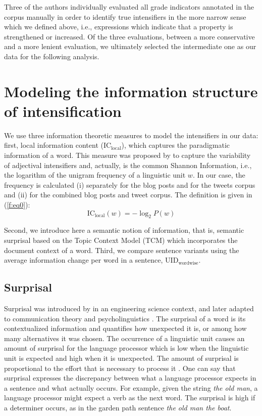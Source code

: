 \documentclass[output=paper,colorlinks,citecolor=brown]{langscibook}
\begin{document}
Three of the authors individually evaluated all  grade indicators annotated in the corpus manually in order to identify true intensifiers in the more narrow sense which we defined above, i.e., expressions which indicate that a property is strengthened or increased. Of the three evaluations, between a more conservative and a more lenient evaluation,  we ultimately selected the intermediate one as our data for the following analysis. 

\section{Modeling the information structure of intensification}\label{sec:information}

We use three information theoretic measures to model the intensifiers in our data: first, local information content ($\mathrm{IC_{local}}$), which captures the paradigmatic information of a word. This measure was proposed by \citet{scherihou2022} to capture the variability of adjectival intensifiers and, actually, is the common Shannon Information, i.e., the logarithm of the unigram frequency of a linguistic unit $w$. In our case, the frequency is calculated (i) separately for the blog posts and for the tweets corpus and (ii) for the combined blog posts and tweet corpus. The definition is given in (\ref{f:eq0}):
\begin{equation}\label{f:eq0}
\text{IC}_{\text{local}}(w) = -\log_2 P(w)
\end{equation}
 
Second, we introduce here a semantic notion of information, that is, semantic surprisal based on the Topic Context Model (TCM) which incorporates the document context of a word. Third, we compare sentence variants using the average information change per word in a sentence, $\mathrm{UID_{wordwise}}$.

\subsection{Surprisal}

Surprisal was introduced by \citet{tribus1961information} in an engineering science context, and later adapted to communication theory and psycholinguistics \citep{hale2001probabilistic,levy2008expectation}.
The surprisal of a word is its contextualized information and quantifies how unexpected it is, or among how many alternatives it was chosen. The occurrence of a linguistic unit causes an amount of surprisal for the language processor which is low when the linguistic unit is expected and high when it is unexpected. The amount of surprisal is proportional to the effort that is necessary to process it \citep{hale2001probabilistic, levy2008expectation}. One can say that surprisal expresses the discrepancy between what a language processor expects in a sentence and what actually occurs. For example, given the string \textit{the old man}, a language processor might expect a verb as the next word. The surprisal is high if a determiner occurs, as in the garden path sentence \textit{the old man the boat}.
 
\end{document}
